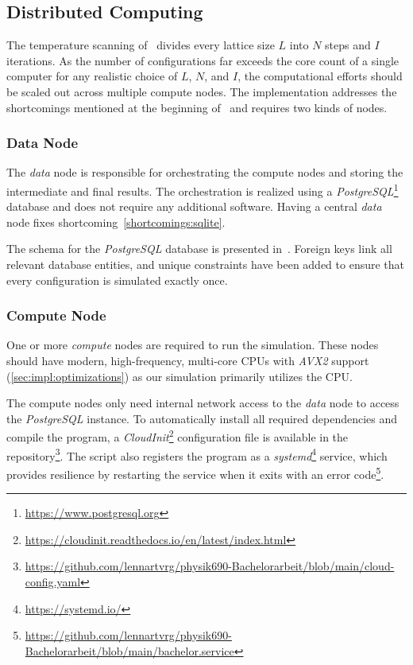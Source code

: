 \subsection{Distributed Computing}\label{sec:impl:computing}
	The temperature scanning of~ divides every lattice size $L$ into $N$ steps and $I$ iterations. As the number of configurations far exceeds the core count of a single computer for any realistic choice of $L$, $N$, and $I$, the computational efforts should be scaled out across multiple compute nodes. The implementation addresses the shortcomings mentioned at the beginning of~ and requires two kinds of nodes.
	
	\subsubsection{Data Node}\label{sec:impl:computing:data}
		The \emph{data} node is responsible for orchestrating the compute nodes and storing the intermediate and final results. The orchestration is realized using a  \emph{PostgreSQL}\footnote{\url{https://www.postgresql.org}} database and does not require any additional software. Having a central \emph{data} node fixes shortcoming~\cref{shortcomings:sqlite}.
		
		The schema for the \emph{PostgreSQL} database is presented in~. Foreign keys link all relevant database entities, and unique constraints have been added to ensure that every configuration is simulated exactly once.
	
	\subsubsection{Compute Node}\label{sec:impl:computing:compute}
		One or more \emph{compute} nodes are required to run the simulation. These nodes should have modern, high-frequency, multi-core CPUs with \emph{AVX2} support (\cref{sec:impl:optimizations}) as our simulation primarily utilizes the CPU.
		
		The compute nodes only need internal network access to the \emph{data} node to access the \emph{PostgreSQL} instance. To automatically install all required dependencies and compile the program, a \emph{CloudInit}\footnote{\url{https://cloudinit.readthedocs.io/en/latest/index.html}} configuration file is available in the repository\footnote{\url{https://github.com/lennartvrg/physik690-Bachelorarbeit/blob/main/cloud-config.yaml}}. The script also registers the program as a \emph{systemd}\footnote{\url{https://systemd.io/}} service, which provides resilience by restarting the service when it exits with an error code\footnote{\url{https://github.com/lennartvrg/physik690-Bachelorarbeit/blob/main/bachelor.service}}.

